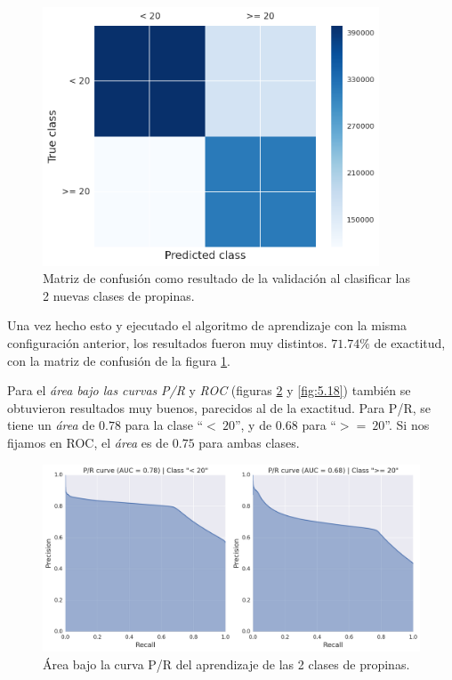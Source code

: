 \begin{figure}[H]
  \centering
  \includegraphics[width=100mm]{figures/ch_05/confusion_matrix_2.png}
  \caption{Matriz de confusión como resultado de la validación al clasificar las 2 nuevas clases de propinas.}
  \label{fig:5.16}
\end{figure}

Una vez hecho esto y ejecutado el algoritmo de aprendizaje con la misma configuración anterior, los resultados fueron muy distintos. $\mathbf{71.74\%}$ de exactitud, con la matriz de confusión de la figura \ref{fig:5.16}.

Para el \emph{área bajo las curvas} \emph{P/R} y \emph{ROC} (figuras \ref{fig:5.17} y \ref{fig:5.18}) también se obtuvieron resultados muy buenos, parecidos al de la exactitud. Para P/R, se tiene un \emph{área} de $0.78$ para la clase ``$<\:20$'', y de $0.68$ para ``$>=\:20$''. Si nos fijamos en ROC, el \emph{área} es de $0.75$ para ambas clases.

\begin{figure}[H]
  \centering
  \includegraphics[width=140mm]{figures/ch_05/pr_auc.png}
  \caption{Área bajo la curva P/R del aprendizaje de las 2 clases de propinas.}
  \label{fig:5.17}
\end{figure}

